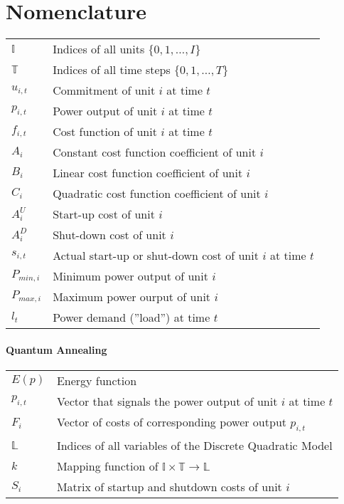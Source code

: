 \chapter*{Nomenclature}

\begin{tabular}{ll}
  $\mathbb{I}$ & Indices of all units $\{0, 1, \ldots, I\}$\\
  $\mathbb{T}$ & Indices of all time steps $\{0, 1, \ldots, T\}$ \\
  $u_{i, t}$ & Commitment of unit $i$ at time $t$ \\
  $p_{i, t}$ & Power output of unit $i$ at time $t$ \\
  $f_{i, t}$ & Cost function of unit $i$ at time $t$ \\
  $A_i$ & Constant cost function coefficient of unit $i$ \\
  $B_i$ & Linear cost function coefficient of unit $i$ \\
  $C_i$ & Quadratic cost function coefficient of unit $i$ \\
  $A^U_i$ & Start-up cost of unit $i$ \\
  $A^D_i$ & Shut-down cost of unit $i$ \\
  $s_{i, t}$ & Actual start-up or shut-down cost of unit $i$ at time $t$ \\
  $P_{min, i}$ & Minimum power output of unit $i$ \\
  $P_{max, i}$ & Maximum power ourput of unit $i$ \\
  $l_t$ & Power demand (''load'') at time $t$
\end{tabular}

\subsubsection{Quantum Annealing}

\begin{tabular}{ll}
  $E(p)$ & Energy function \\
  $p_{i, t}$ & Vector that signals the power output of unit $i$ at time $t$ \\
  $F_{i}$ & Vector of costs of corresponding power output $p_{i, t}$ \\
  $\mathbb{L}$ & Indices of all variables of the Discrete Quadratic Model \\
  $k$ & Mapping function of $\mathbb{I} \times \mathbb{T} \to \mathbb{L}$ \\
  $S_{i}$ & Matrix of startup and shutdown costs of unit $i$
\end{tabular}
